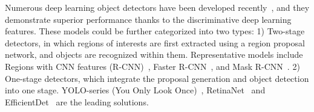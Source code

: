 \documentclass[letterpaper]{article} %
\def \eg {\emph{e.g.}}
\newcommand\rjf[1]{\textcolor{red}{\{RJF: #1\}}}
\begin{document}
\begin{figure}[!tb]
{ %
 } 
	\label{fig: structure}
\end{figure}

Numerous deep learning object detectors have been developed recently~\cite{Ren_2017_Faster, Ge_2021_YOLOX}, %
and they demonstrate superior performance thanks to the discriminative deep learning features. 
These models could be further categorized into two types: 1) Two-stage detectors, in which regions of interests are first extracted using a region proposal network, and objects are recognized within them. %
Representative models include %
Regions with CNN features (R-CNN)~\cite{Girshick_2014_Rich}, Faster R-CNN~\cite{Ren_2017_Faster}, and Mask R-CNN~\cite{He_2017_Mask}. 2) One-stage detectors, which integrate the proposal generation and object detection into one stage. YOLO-series (You Only Look Once)~\cite{Redmon_2016_You, Redmon_2017_YOLO9000, Ge_2021_YOLOX}, %
RetinaNet~\cite{Lin_2020_Focal} and EfficientDet~\cite{Tan_2020_EfficientDet} are the leading solutions.
\end{document}
